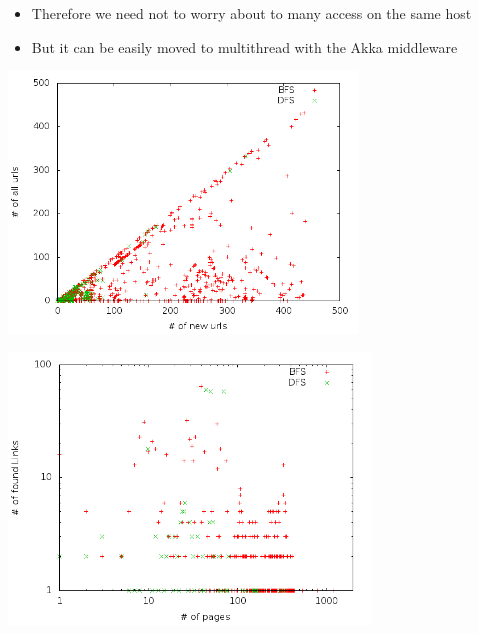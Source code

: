 \begin{frame}[c]
	\begin{itemize}
		\begin{itemize}
			\item Therefore we need not to worry about to many access on the same host
			\item But it can be easily moved to multithread with the Akka middleware
		\end{itemize}
	\end{itemize}
\end{frame}

\begin{frame}[c]
	\includegraphics[width=25em]{../crawler/src/main/resources/results/bfs/newVsFoundUrls.png} 
\end{frame}

\begin{frame}[c]
	\includegraphics[width=26em]{../crawler/src/main/resources/results/bfs/histogram.png} 
\end{frame}

